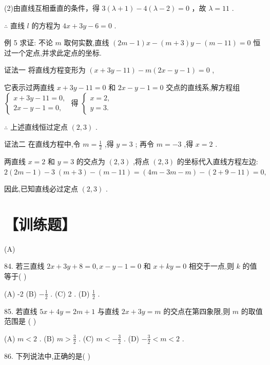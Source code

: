 \documentclass[10pt]{article}
\begin{document}
(2)由直线互相垂直的条件，得 \(3\left( {\lambda  + 1}\right)  - 4\left( {\lambda  - 2}\right)  = 0\) ，故 \(\lambda  = {11}\) .

\(\therefore\) 直线 \(l\) 的方程为 \({4x} + {3y} - 6 = 0\) .

例 5 求证: 不论 \(m\) 取何实数,直线 \(\left( {{2m} - 1}\right) x - \left( {m + 3}\right) y - \left( {m - {11}}\right)  = 0\) 恒过一个定点,并求此定点的坐标.

证法一 将直线方程变形为 \(\left( {x + {3y} - {11}}\right)  - m\left( {{2x} - y - 1}\right)  = 0\) ,

它表示过两直线 \(x + {3y} - {11} = 0\) 和 \({2x} - y - 1 = 0\) 交点的直线系,解方程组 \(\left\{  {\begin{array}{l} x + {3y} - {11} = 0, \\  {2x} - y - 1 = 0, \end{array}\text{ 得 }\left\{  \begin{array}{l} x = 2, \\  y = 3. \end{array}\right. }\right.\)

\(\therefore\) 上述直线恒过定点 \(\left( {2,3}\right)\) .

证法二 在直线方程中,令 \(m = \frac{1}{2}\) ,得 \(y = 3\) ; 再令 \(m =  - 3\) ,得 \(x = 2\) .

两直线 \(x = 2\) 和 \(y = 3\) 的交点为 \(\left( {2,3}\right)\) ,将点 \(\left( {2,3}\right)\) 的坐标代入直线方程左边: \(2\left( {{2m} - 1}\right)  - 3 \; \left( {m + 3}\right)  - \left( {m - {11}}\right)  = \left( {{4m} - {3m} - m}\right)  - \left( {2 + 9 - {11}}\right)  = 0,\)

因此,已知直线必过定点 \(\left( {2,3}\right)\) .

\section*{【训练题】}

(A)

84. 若三直线 \({2x} + {3y} + 8 = 0,x - y - 1 = 0\) 和 \(x + {ky} = 0\) 相交于一点,则 \(k\) 的值等于( )

(A) -2 (B) \(- \frac{1}{2}\) . (C) 2 . (D) \(\frac{1}{2}\) .

85. 若直线 \({5x} + {4y} = {2m} + 1\) 与直线 \({2x} + {3y} = m\) 的交点在第四象限,则 \(m\) 的取值范围是 ( )

(A) \(m < 2\) . (B) \(m > \frac{3}{2}\) . (C) \(m <  - \frac{3}{2}\) . (D) \(- \frac{3}{2} < m < 2\) .

86. 下列说法中,正确的是( )
\end{document}
